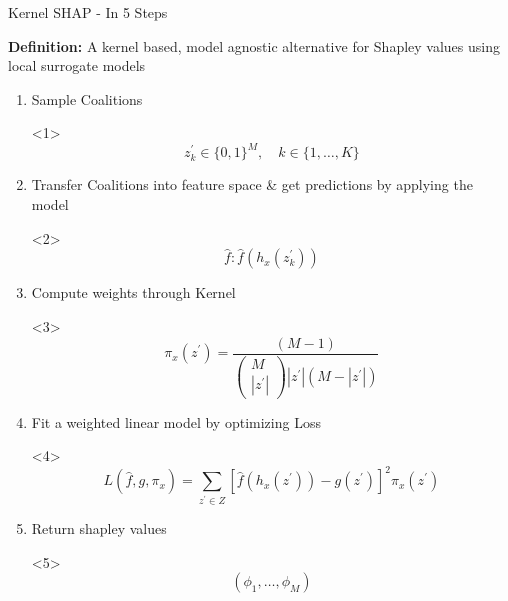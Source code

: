 \documentclass[11pt,compress,t,notes=noshow, aspectratio=169, xcolor=table]{beamer}
\begin{document}
\begin{vbframe}{Kernel SHAP - In 5 Steps}

\textbf{Definition:} A kernel based, model agnostic alternative for Shapley values using local surrogate models\\
\vspace{1cm}
\begin{enumerate}
    \item Sample Coalitions 
    \begin{onlyenv}<1>
    $$z_{k}^{\prime} \in\{0,1\}^{M}, \quad k \in\{1, \ldots, K\}$$
    \end{onlyenv}
    
    \item Transfer Coalitions into feature space \& get predictions by applying the model
    
    \begin{onlyenv}<2>
    $$\hat{f}: \hat{f}\left(h_{x}\left(z_{k}^{\prime}\right)\right)$$
    \end{onlyenv}
    
    \item Compute weights through Kernel
    \begin{onlyenv}<3>
    $$\pi_{x}\left(z^{\prime}\right)=\frac{(M-1)}{\left(\begin{array}{c} M \\\left|z^{\prime}\right|\end{array}\right)\left|z^{\prime}\right|\left(M-\left|z^{\prime}\right|\right)}$$
    \end{onlyenv}
    
    \item Fit a weighted linear model by optimizing Loss
    \begin{onlyenv}<4>
    $$L\left(\hat{f}, g, \pi_{x}\right)=\sum_{z^{\prime} \in Z}\left[\hat{f}\left(h_{x}\left(z^{\prime}\right)\right)-g\left(z^{\prime}\right)\right]^{2} \pi_{x}\left(z^{\prime}\right)$$
    \end{onlyenv}

    \item Return shapley values
    \begin{onlyenv}<5>
    $$(\phi_1, \ldots, \phi_M)$$
    \end{onlyenv}
    
    
\end{enumerate}

\end{vbframe}
\end{document}
